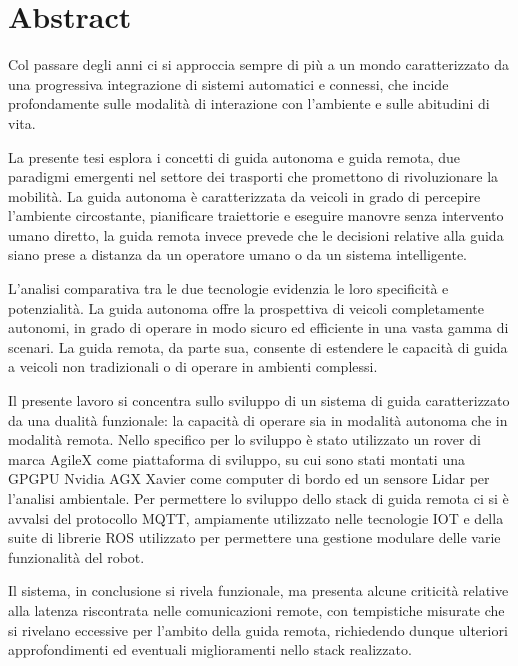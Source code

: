 \chapter*{Abstract}

Col passare degli anni ci si approccia sempre di più a un mondo caratterizzato da una progressiva integrazione di sistemi automatici e connessi, che incide profondamente sulle modalità di interazione con l'ambiente e sulle abitudini di vita.

\noindent La presente tesi esplora i concetti di guida autonoma e guida remota, due paradigmi emergenti nel settore dei trasporti che promettono di rivoluzionare la mobilità. La guida autonoma è caratterizzata da veicoli in grado di percepire l'ambiente circostante, pianificare traiettorie e eseguire manovre senza intervento umano diretto, la guida remota invece prevede che le decisioni relative alla guida siano prese a distanza da un operatore umano o da un sistema intelligente.

\noindent L'analisi comparativa tra le due tecnologie evidenzia le loro specificità e potenzialità. La guida autonoma offre la prospettiva di veicoli completamente autonomi, in grado di operare in modo sicuro ed efficiente in una vasta gamma di scenari. La guida remota, da parte sua, consente di estendere le capacità di guida a veicoli non tradizionali o di operare in ambienti complessi.

\noindent Il presente lavoro si concentra sullo sviluppo di un sistema di guida caratterizzato da una dualità funzionale: la capacità di operare sia in modalità autonoma che in modalità remota. Nello specifico per lo sviluppo è stato utilizzato un rover di marca AgileX come piattaforma di sviluppo, su cui sono stati montati una GPGPU Nvidia AGX Xavier come computer di bordo ed un sensore Lidar per l'analisi ambientale. Per permettere lo sviluppo dello stack di guida remota ci si è avvalsi del protocollo MQTT, ampiamente utilizzato nelle tecnologie IOT e della suite di librerie ROS utilizzato per permettere una gestione modulare delle varie funzionalità del robot.

\noindent Il sistema, in conclusione si rivela funzionale, ma presenta alcune criticità relative alla latenza riscontrata nelle comunicazioni remote, con tempistiche misurate che si rivelano eccessive per l'ambito della guida remota, richiedendo dunque ulteriori approfondimenti ed eventuali miglioramenti nello stack realizzato.